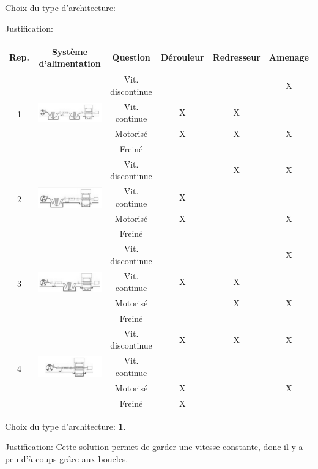 {{Choix du type d'architecture:

Justification: }{
\begin{tabular}{|c|c|c|c|c|c|}
\hline
Rep. & Système d'alimentation & Question & Dérouleur & Redresseur & Amenage \\ \hline
\multirow{4}{*}{1} & \multirow{4}{*}{\includegraphics[width=0.3\linewidth]{img/dr1_1}} & Vit. discontinue & & & X \\ \cline{3-6}
 & & Vit. continue & X & X & \\ \cline{3-6}
 & & Motorisé & X & X & X \\ \cline{3-6}
 & & Freiné & & & \\ \hline
\multirow{4}{*}{2} & \multirow{4}{*}{\includegraphics[width=0.3\linewidth]{img/dr1_2}} & Vit. discontinue & & X & X \\ \cline{3-6}
 & & Vit. continue & X & & \\ \cline{3-6}
 & & Motorisé & X & & X \\ \cline{3-6}
 & & Freiné & & & \\ \hline
\multirow{4}{*}{3} & \multirow{4}{*}{\includegraphics[width=0.3\linewidth]{img/dr1_3}} & Vit. discontinue & & & X \\ \cline{3-6}
 & & Vit. continue & X & X & \\ \cline{3-6}
 & & Motorisé & & X & X \\ \cline{3-6}
 & & Freiné & & & \\ \hline
\multirow{4}{*}{4} & \multirow{4}{*}{\includegraphics[width=0.3\linewidth]{img/dr1_4}} & Vit. discontinue & X & X & X \\ \cline{3-6}
 & & Vit. continue & & & \\ \cline{3-6}
 & & Motorisé & X & & X \\ \cline{3-6}
 & & Freiné & X & & \\ \hline
\end{tabular}

Choix du type d'architecture: \textbf{1}.

Justification: Cette solution permet de garder une vitesse constante, donc il y a peu d'à-coups grâce aux boucles.
}}

